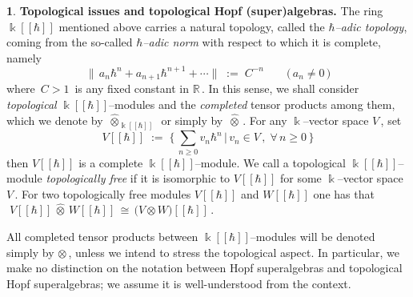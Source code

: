 \documentclass[12pt,reqno,twoside,a4paper]{amsart}
\numberwithin{equation}{section}
\theoremstyle{definition}
\newtheorem{free text}[lema]{}
\theoremstyle{remark}
\def \kh{{\Bbbk[[\hbar]]}}
\theoremstyle{plain}
\begin{document}
\begin{free text}  \label{Topol-issues-topol-Hopf-super-alg}
%
{\bf Topological issues and topological Hopf (super)algebras.}  The ring  $ \kh $  mentioned
above carries a natural topology, called the  \textit{$ \hbar $--adic  topology},  coming from
the so-called  \textit{$ \hbar $--adic  norm\/}  with respect to which it is complete, namely
%
  $$  \big\|\, a_n \hbar^n + a_{n+1} \hbar^{n+1} + \cdots \big\|  \; := \;  C^{-n}
  \qquad  \big(\, a_n \not= 0 \,\big)  $$
%
 where $ \, C > 1 \, $  is any fixed constant in  $ \mathbb{R} \, $.
 In this sense, we shall consider \textit{topological\/}  $ \kh $--modules  and the  \textit{completed\/}  tensor products among them, which we denote by
 $ \, \widehat{\otimes}_\kh \, $  or simply by  $ \, \widehat{\otimes} \, $.
 For any  $ \Bbbk $--vector  space  $ V \, $,  set
  $$  V[[\hbar]]  \; := \;  \Big\{\, {\textstyle \sum_{n \geq 0}}
  v_n \hbar^n \,\Big|\, v_n \in V \, , \; \forall \, n \geq 0 \,\Big\}  $$
%
 then  $ V[[\hbar]] $  is a complete  $ \kh $--module.  We call a topological  $ \kh $--module
 \textit{topologically free\/}  if it is isomorphic to  $ V[[\hbar]] $  for some
 $ \Bbbk $--vector  space  $ V \, $.  For two topologically free modules
 $ V[[\hbar]] $  and  $ W[[\hbar]] $  one has that
 $ \; V[[\hbar]] \,\widehat{\otimes}\, W[[\hbar]] \, \cong \,
 \big(V \otimes W\big)[[\hbar]] \, $.
   \eject

  All completed tensor products between  $ \kh $--modules
 will be denoted simply by  $ \otimes \, $,
 unless we intend to stress the topological aspect.  In particular,
 we make no distinction on the notation
 between Hopf superalgebras and topological
 Hopf superalgebras; we assume it is well-understood from the context.
%
\end{free text}

\vskip11pt
\end{document}
